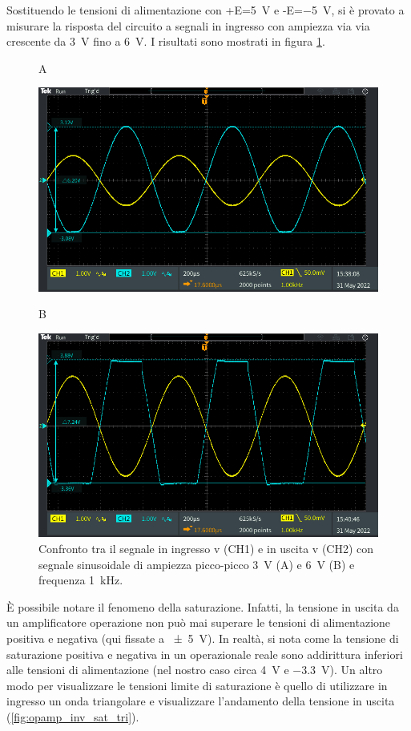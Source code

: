 \noindent
Sostituendo le tensioni di alimentazione con +E=\SI{+5}{\volt} e -E=\SI{-5}{\volt}, si è provato a misurare la risposta del circuito a segnali in ingresso con ampiezza via via crescente da \SI{3}{\volt} fino a \SI{6}{\volt}. I risultati sono mostrati in figura \ref{fig:opamp_inv_sat}.
\begin{figure}[h!]
	\centering
	A
	\vspace{0.5cm}
	
	\includegraphics[width=0.7\linewidth]{./ImageFiles/Laboratorio 4/TEK00008}
	
	B
	\vspace{0.5cm}
	
	\includegraphics[width=0.7\linewidth]{./ImageFiles/Laboratorio 4/TEK00012}
	\caption{Confronto tra il segnale in ingresso v (CH1)  e in uscita v (CH2) con segnale sinusoidale di ampiezza picco-picco \SI{3}{\volt} (A) e \SI{6}{\volt} (B) e frequenza \SI{1}{\kilo\hertz}.}
	\label{fig:opamp_inv_sat}
\end{figure}
\`E possibile notare il fenomeno della saturazione. Infatti, la tensione in uscita da un amplificatore operazione non può mai superare le tensioni di alimentazione positiva e negativa (qui fissate a \SI{+-5}{\volt}). In realtà, si nota come la tensione di saturazione positiva e negativa in un operazionale reale sono addirittura inferiori alle tensioni di alimentazione (nel nostro caso circa \SI{4}{\volt} e \SI{-3.3}{\volt}). Un altro modo per visualizzare le tensioni limite di saturazione è quello di utilizzare in ingresso un onda triangolare e visualizzare l'andamento della tensione in uscita (\Fig\ref{fig:opamp_inv_sat_tri}).
